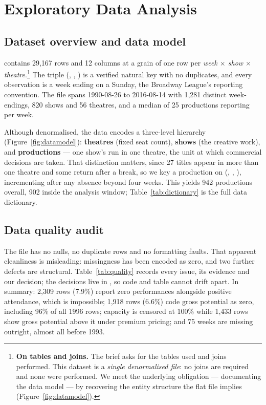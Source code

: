 \section{Exploratory Data Analysis}

\subsection{Dataset overview and data model}

 contains 29{,}167 rows and 12 columns at a grain of
one row per \emph{week $\times$ show $\times$ theatre}.\footnote{%
\textbf{On tables and joins.} The brief asks for the tables used and joins
performed. This dataset is a \emph{single denormalised file}: no joins are
required and none were performed. We meet the underlying obligation ---
documenting the data model --- by recovering the entity structure the flat file
implies (Figure~\ref{fig:datamodel}).}
The triple (, , ) is a
verified natural key with no duplicates, and every observation is a week ending
on a Sunday, the Broadway League's reporting convention. The file spans 1990-08-26 to 2016-08-14
with 1{,}281 distinct week-endings, 820 shows and 56 theatres, and a median of
25 productions reporting per week.

Although denormalised, the data encodes a three-level hierarchy
(Figure~\ref{fig:datamodel}): \textbf{theatres} (fixed seat count),
\textbf{shows} (the creative work), and \textbf{productions} --- one show's run
in one theatre, the unit at which commercial decisions are taken. That
distinction matters, since 27 titles appear in more than one theatre and some
return after a break, so we key a production on
(, , ), incrementing 
after any absence beyond four weeks. This yields 942 productions overall, 902
inside the analysis window; Table~\ref{tab:dictionary} is the full data
dictionary.

\subsection{Data quality audit}

The file has no nulls, no duplicate rows and no formatting faults. That apparent
cleanliness is misleading: missingness has been encoded as zero, and two further
defects are structural. Table~\ref{tab:quality} records every issue, its
evidence and our decision; the decisions live in , so
code and table cannot drift apart. In summary: 2{,}309 rows (7.9\%) report zero
performances alongside positive attendance, which is impossible; 1{,}918 rows
(6.6\%) code gross potential as zero, including 96\% of all 1996 rows; capacity
is censored at 100\% while 1{,}433 rows show gross potential above it under
premium pricing; and 75 weeks are missing outright, almost all before 1993.

